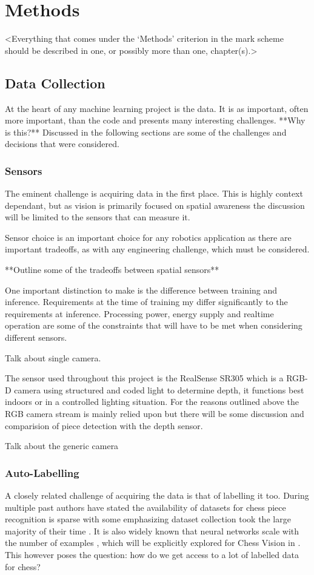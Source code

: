 \chapter{Methods}
\label{methods}

<Everything that comes under the `Methods' criterion in the mark scheme should be described in one, or possibly more than one, chapter(s).>

\section{Data Collection}
At the heart of any machine learning project is the data.  
It is as important, often more important, than the code and presents many interesting
challenges.  **Why is this?**
Discussed in the following sections are some of the challenges and decisions that were considered.

\subsection{Sensors}
The eminent challenge is acquiring data in the first place.  This is highly context 
dependant, but as vision is primarily focused on spatial awareness the discussion 
will be limited to the sensors that can measure it.

Sensor choice is an important choice for any robotics application as there are 
important tradeoffs, as with any engineering challenge, which must be considered.

**Outline some of the tradeoffs between spatial sensors**

One important distinction to make is the difference between training and inference.
Requirements at the time of training my differ significantly to the requirements at 
inference.  Processing power, energy supply and realtime operation are some
of the constraints that will have to be met when considering different sensors.

Talk about single camera. 

The sensor used throughout this project is the RealSense SR305 which is a RGB-D camera
using structured and coded light to determine depth, it functions best indoors or in a 
controlled lighting situation.  For the reasons outlined above the RGB camera stream is 
mainly relied upon but there will be some discussion and comparision of piece detection 
with the depth sensor.  

Talk about the generic camera

\subsection{Auto-Labelling}
A closely related challenge of acquiring the data is that of labelling it too. 
During  multiple past authors have stated the availability of 
datasets for chess piece recognition is sparse \cite{} with some emphasizing
dataset collection took the large majority of their time \cite{}.
It is also widely known that neural networks scale with the number of examples \cite{}, 
which will be explicitly explored for Chess Vision in .
This however poses the question: how do we get access to a lot of labelled data 
for chess?

